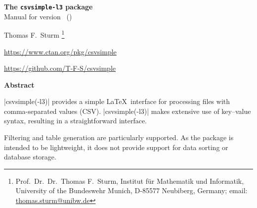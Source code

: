 \documentclass[a4paper,11pt]{ltxdoc}
\begin{document}
\begin{center}
\begin{tcolorbox}[enhanced,hbox,tikznode,left=8mm,right=8mm,boxrule=0.4pt,
  colback=white,colframe=black!50!yellow,
  drop lifted shadow=black!50!yellow,arc is angular,
  before=\par\vspace*{5mm},after=\par\bigskip]
{\bfseries\LARGE The \texttt{csvsimple-l3} package}\\[3mm]
{\large Manual for version \version\ (\datum)}
\end{tcolorbox}
{\large Thomas F.~Sturm%
  \footnote{Prof.~Dr.~Dr.~Thomas F.~Sturm, Institut f\"{u}r Mathematik und Informatik,
    University of the Bundeswehr Munich, D-85577 Neubiberg, Germany;
    email: \href{mailto:thomas.sturm@unibw.de}{thomas.sturm@unibw.de}}\par\medskip
\normalsize\url{https://www.ctan.org/pkg/csvsimple}\par
\url{https://github.com/T-F-S/csvsimple}
}
\end{center}
\bigskip
\begin{absquote}
  \begin{center}\bfseries Abstract\end{center}
  |csvsimple(-l3)| provides a simple \LaTeX\ interface for processing files with
  comma-separated values (CSV).
  |csvsimple(-l3)| makes extensive use of key–value syntax, resulting in a straightforward interface.

  Filtering and table generation are particularly supported. As the package
  is intended to be lightweight, it does not provide support for data sorting or
  database storage.
\end{absquote}

\vspace{1cm}
\end{document}
